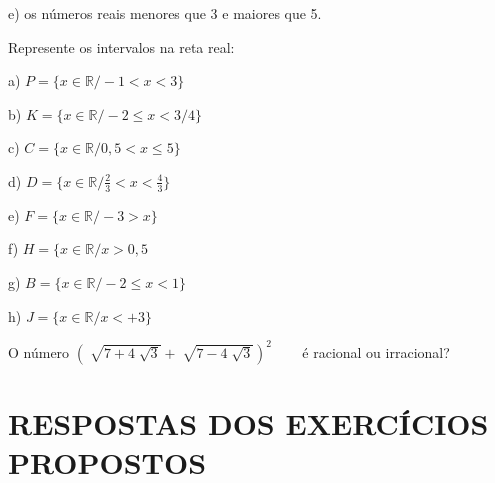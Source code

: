 \begin{exercicios}
\begin{multicols}{2}
		e) os números reais menores que 3 e maiores que 5.
	\end{multicols}

	\exitem{}  Represente os intervalos na reta real:
	\begin{multicols}{2}
	a) $P= \{ x \in {\mathbb{R} }/ -  1 < x < 3 \} $
	 
	b) $K= \{ x \in \mathbb{R} / - 2 \leq x < 3/4 \} $ 

	c) $C= \{ x \in \mathbb{R} /0, 5 < x \leq  5 \} $
	
	d) $D= \{ x \in \mathbb{R} / \frac{2}{3} < x < \frac{4}{3} \} $ 

	e) $F= \{ x \in \mathbb{R}/ - 3 > x \} $
	
	f) $H = \{ x \in \mathbb{R}/ x > 0, 5$ 

	g) $B= \{ x \in \mathbb{R} / - 2 \leq x < 1 \} $
	
	h) $J= \{ x \in \mathbb{R} / x < +3 \} $ 
\end{multicols}
	\exitem{} O número \(  \left( \sqrt[]{7+4\sqrt[]{3}}+\sqrt[]{7-4\sqrt[]{3}} \right) ^{2} \) ~~~ é racional ou irracional?
\end{exercicios}

\section{RESPOSTAS DOS EXERCÍCIOS PROPOSTOS}

